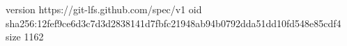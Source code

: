 version https://git-lfs.github.com/spec/v1
oid sha256:12fef9ce6d3c7d3d2838141d7fbfc21948ab94b0792dda51dd10fd548e85cdf4
size 1162
